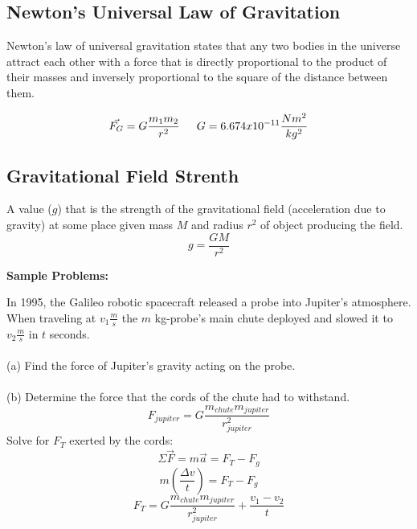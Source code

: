 \documentclass{article}
\begin{document}
	\subsection{Newton's Universal Law of Gravitation}
    	Newton's law of universal gravitation states that any two bodies in the universe attract each other with a force that is directly proportional to the product of their masses and inversely proportional to the square of the distance between them.
        
        \[
        	\vec{F_G}=G\frac{m_1m_2}{r^2} \indent
            G=6.674x10^{-11}\frac{Nm^2}{kg^2}
        \]
        
	\subsection{Gravitational Field Strenth}
    	A value ($g$) that is the strength of the gravitational field (acceleration due to gravity) at some place given mass $M$ and radius $r^2$ of object producing the field.
        \[
        	g=\frac{GM}{r^2}
        \]
        
  		\noindent\textbf{Sample Problems:}
        
        \begin{multicols}{2}
        	In 1995, the Galileo robotic spacecraft released a probe into Jupiter’s atmosphere.  When traveling at $v_1 \frac{m}{s}$ the $m$ kg-probe’s main chute deployed and slowed it to $v_2 \frac{m}{s}$ in $t$ seconds.\\\\ (a) Find the force of Jupiter’s gravity acting on the probe.\\\\ (b) Determine the force that the cords of the chute had to withstand.
		\columnbreak
        \vfill
        	\[
            	F_{jupiter}=G\frac{m_{chute}m_{jupiter}}{r_{jupiter}^2}
            \]
            Solve for $F_T$ exerted by the cords:
            \[
            	\Sigma\vec{F}=m\vec{a}=F_T-F_g
            \]
            \[
            	m(\frac{\Delta v}{t})=F_T-F_g
            \]
            \[
            	F_T=G\frac{m_{chute}m_{jupiter}}{r_{jupiter}^2}+\frac{v_1-v_2}{t}
            \]
        \end{multicols}
        
        \noindent{\centerline{\rule{5cm}{0.4pt}}}
        
\end{document}

